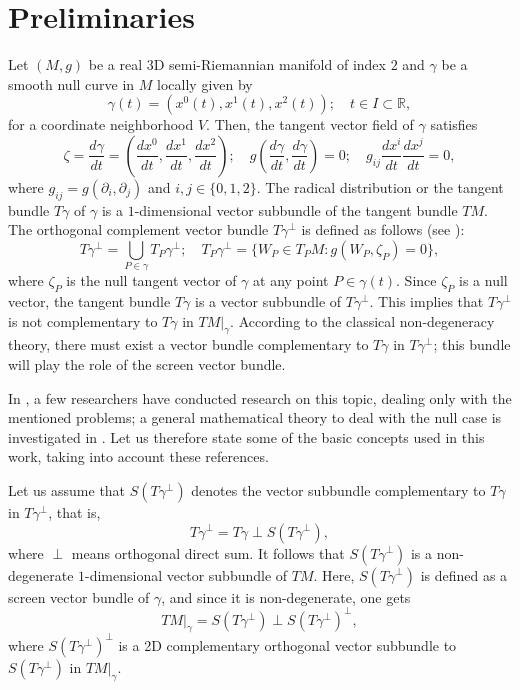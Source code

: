 \documentclass [reqno]{amsart}
\theoremstyle{plain}
\numberwithin{equation}{section}
\begin{document}
\section{Preliminaries}

Let $(M,g)$ be a real 3D semi-Riemannian manifold of index $2$ and $\gamma$ be a smooth null curve in $M$ locally given by
\[
\gamma(t)=\left(x^0(t), x^1(t), x^2(t)\right); \quad t \in I \subset \mathbb{R},
\]
for a coordinate neighborhood $V$. Then, the tangent vector field of $\gamma$ satisfies
\[
\zeta = \frac{d\gamma}{dt} = \left(\frac{dx^0}{dt}, \frac{dx^1}{dt}, \frac{dx^2}{dt}\right); \quad g\left(\frac{d\gamma}{dt}, \frac{d\gamma}{dt}\right) = 0; \quad g_{ij} \frac{dx^i}{dt} \frac{dx^j}{dt} = 0,
\]
where $g_{ij} = g(\partial_i, \partial_j)$ and $i,j \in \{0,1,2\}$. The radical distribution or the tangent bundle $T\gamma$ of $\gamma$ is a $1$-dimensional vector subbundle of the tangent bundle $TM$. The orthogonal complement vector bundle $T\gamma^\perp$ is defined as follows (see \cite{11}):
\[
T\gamma^\perp = \bigcup_{P \in \gamma} T_P \gamma^\perp; \quad T_P \gamma^\perp = \{W_P \in T_P M : g(W_P, \zeta_P) = 0\},
\]
where $\zeta_P$ is the null tangent vector of $\gamma$ at any point $P \in \gamma(t)$. Since $\zeta_P$ is a null vector, the tangent bundle $T\gamma$ is a vector subbundle of $T\gamma^\perp$. This implies that $T\gamma^\perp$ is not complementary to $T\gamma$ in $TM|_\gamma$. According to the classical non-degeneracy theory, there must exist a vector bundle complementary to $T\gamma$ in $T\gamma^\perp$; this bundle will play the role of the screen vector bundle.

In \cite{3,5,8}, a few researchers have conducted research on this topic, dealing only with the mentioned problems; a general mathematical theory to deal with the null case is investigated in \cite{4}. Let us therefore state some of the basic concepts used in this work, taking into account these references.

Let us assume that $S(T\gamma^\perp)$ denotes the vector subbundle complementary to $T\gamma$ in $T\gamma^\perp$, that is,
\[
T\gamma^\perp = T\gamma \perp S(T\gamma^\perp),
\]
where $\perp$ means orthogonal direct sum. It follows that $S(T\gamma^\perp)$ is a non-degenerate $1$-dimensional vector subbundle of $TM$. Here, $S(T\gamma^\perp)$ is defined as a screen vector bundle of $\gamma$, and since it is non-degenerate, one gets
\begin{equation}
TM|_\gamma = S(T\gamma^\perp) \perp S(T\gamma^\perp)^\perp,
\end{equation}
where $S(T\gamma^\perp)^\perp$ is a 2D complementary orthogonal vector subbundle to $S(T\gamma^\perp)$ in $TM|_\gamma$.
\end{document}
